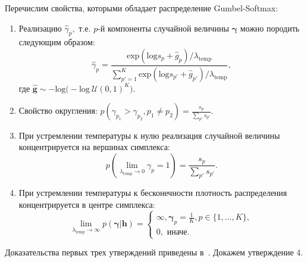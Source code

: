 Перечислим свойства, которыми обладает распределение Gumbel-Softmax:
\begin{enumerate}
\item Реализацию $\hat{\gamma}_p,$ т.е. $p$-й компоненты случайной величины $\boldsymbol{\gamma}$  можно породить следующим образом:
\[
    \hat{\gamma}_p = \frac{\text{exp}(\text{log}s_p+\hat{g}_p)/\lambda_{\text{temp}}}{\sum_{p'=1}^{K}\text{exp}(\text{log}s_{p'}+\hat{g}_{p'})/\lambda_{\text{temp}}},
\]
где $\hat{\mathbf{g}} \sim -\text{log}\bigl(-\text{log}~\mathcal{U}(0,1)^K\bigr).$ 

\item Свойство округления: $p(\gamma_{p_1} > \gamma_{p_2}, p_1\neq p_2) = \frac{s_p}{\sum_{p'}s_{p'}}.$

\item При устремлении температуры к нулю реализация случайной величины концентрируется на вершинах симплекса:
\[
    p(\lim_{\lambda_{\text{temp}} \to 0}  \gamma_{p} = 1)  = \frac{s_p}{\sum_{p'}s_{p'}}.
\]


\item При устремлении температуры к бесконечности плотность распределения концентрируется в центре симплекса:
\begin{equation}
\label{eq:theorem_gs}
    \lim_{\lambda_{\text{temp}} \to \infty}  p(\boldsymbol{\gamma}|\mathbf{h}) = 
    \begin{cases}
    \infty, \boldsymbol{\gamma}_p = \frac{1}{K}, p \in \{1,\dots,K\},\\
    0, \text{ иначе.}
    \end{cases}
\end{equation}
\end{enumerate}

Доказательства первых трех утверждений приведены в~\cite{gumbel}. Докажем утверждение 4.

